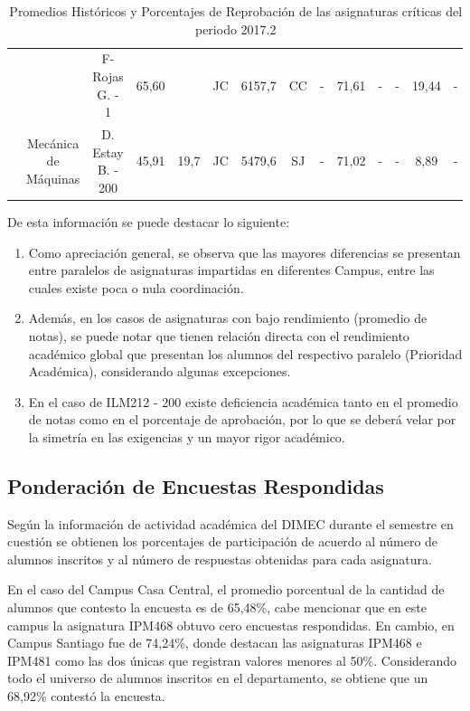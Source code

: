 \documentclass[12pt]{article}
\begin{document}
\begin{table}[H]
{\begin{tabular}{|c|c|c|c|c|c|c|c|c|c|c|c|c|c|}
\rowcolor[HTML]{C0C0C0} 
\cellcolor[HTML]{C0C0C0} & \cellcolor[HTML]{C0C0C0} & F- Rojas G. - 1 & 65,60 & \cellcolor[HTML]{C0C0C0} & JC & 6157,7 & CC & - & 71,61 & - & - & 19,44 & - \\ \cline{3-4} \cline{6-14} 
\rowcolor[HTML]{C0C0C0} 
\multirow{-2}{*}{\cellcolor[HTML]{C0C0C0}ILM254} & \multirow{-2}{*}{\cellcolor[HTML]{C0C0C0}Mecánica de Máquinas} & D. Estay B. - 200 & 45,91 & \multirow{-2}{*}{\cellcolor[HTML]{C0C0C0}19,7} & JC & 5479,6 & SJ & - & 71,02 & - & - & 8,89 & - \\ \hline
\end{tabular}}
\caption{Promedios Históricos y Porcentajes de Reprobación de las asignaturas críticas del periodo 2017.2}
\end{table}
\begin{text}
De esta información se puede destacar lo siguiente:
\begin{enumerate}
    \item Como apreciación general, se observa que las mayores diferencias se presentan entre paralelos de asignaturas impartidas en diferentes Campus, entre las cuales existe poca o nula coordinación.
    \item Además, en los casos de asignaturas con bajo rendimiento (promedio de notas), se puede notar que tienen relación directa con el rendimiento académico global que presentan los alumnos del respectivo paralelo (Prioridad Académica), considerando algunas excepciones. 
    \item En el caso de ILM212 - 200 existe deficiencia académica tanto en el promedio de notas como en el porcentaje de aprobación, por lo que se deberá velar por la simetría en las exigencias y un mayor rigor académico. 
\end{enumerate}
\end{text}



\subsection{Ponderación de Encuestas Respondidas}
\begin{text}
Según la información de actividad académica del DIMEC durante el semestre en cuestión se obtienen los porcentajes de participación de acuerdo al número de alumnos inscritos y al número de respuestas obtenidas para cada asignatura.\par
En el caso del Campus Casa Central, el promedio porcentual de la cantidad de alumnos que contesto la encuesta es de 65,48\%, cabe mencionar que en este campus la asignatura IPM468 obtuvo cero encuestas respondidas. En cambio, en Campus Santiago fue de 74,24\%, donde destacan las asignaturas IPM468 e IPM481 como las dos únicas que registran valores menores al 50\%. Considerando todo el universo de alumnos inscritos en el departamento, se obtiene que un 68,92\% contestó la encuesta.  
\end{text}
\end{document}
